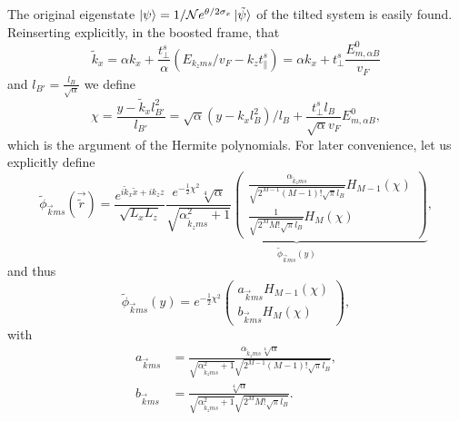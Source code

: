 The original eigenstate \(\ket{\psi } = 1 /\mathcal{N} e^{\theta /2 \sigma _{x}} \ket{\tilde{\psi} }\) of the tilted system is easily found.
Reinserting explicitly, in the boosted frame, that
\[
  \tilde{k}_{x} = \alpha k_{x} + \frac{t_{\perp}^s}{\alpha} (E_{k_z m s} /v_F- k_{z} t_{\parallel}^s)
  = \alpha k_x + t_{\perp}^s \frac{E^0_{m, \alpha B} }{v_{F}}
\]
and \(l_{B'}=\frac{l_{B}}{\sqrt{\alpha} }\)
we define
\begin{equation}
  \label{eq:49}
  \chi =
  \frac{y-\tilde{k}_{x} l_{B'}^2}{l_{B'}}
  =
  \sqrt{\alpha } (y-k_{x} l_{B}^2) /l_{B}
  + \frac{ t_{\perp}^s l_B }{ \sqrt{\alpha} v_F} E^{0}_{m, \alpha B},
\end{equation}
which is the argument of the Hermite polynomials.
For later convenience, let us explicitly define
\begin{equation}
  \label{eq:50}
  \tilde{\phi} _{\vec{k} m s} (\vec{\tilde{r}}) =
  \frac{e^{i \tilde{k}_{x} \tilde{x} + i k_{z} z}}{\sqrt{L_{x} L_{z}} }
  \underbrace{
  \frac{
    e^{-\frac{1}{2} \chi ^2}
    \sqrt[4]{\alpha }
  }
  {\sqrt{\alpha^2_{\tilde{k}_{z} m s} + 1} }
  \begin{pmatrix}
    \frac{\alpha_{\tilde{k}_z m s}}{\sqrt{2^{M-1} (M-1)! \sqrt{\pi } l_{B}}} H_{M-1}\left( \chi  \right)\\
    \frac{1}{\sqrt{2^M M! \sqrt{\pi } l_{B}}} H_M \left( \chi \right)
  \end{pmatrix}}_{\tilde{\phi}_{\vec{k} m s} (y)},
\end{equation}
and thus
\begin{equation}
  \label{eq:51}
  \tilde{\phi}_{\vec{k} m s} (y) =
  e^{-\frac{1}{2} \chi ^2}
  \begin{pmatrix}
    a_{\vec{k} m s} H_{M-1} (\chi)\\
    b_{\vec{k} m s} H_{M} (\chi)
  \end{pmatrix},
\end{equation}
with
\begin{align}
 \label{eq:52}
  a_{\vec{k} m s} &=
                    \frac{
                    \alpha_{\tilde{k}_z m s} \sqrt[4]{\alpha }
                    }{
                    \sqrt{\alpha^2 _{\tilde{k}_z m s} + 1}
                    \sqrt{2^{M-1} (M-1)! \sqrt{\pi} l_B}
                    },\\
  \label{eq:53}
  b_{\vec{k} m s} &=
                    \frac{
                     \sqrt[4]{\alpha }
                    }{
                    \sqrt{\alpha^2 _{\tilde{k}_z m s} + 1}
                    \sqrt{2^{M} M! \sqrt{\pi} l_B}
                    }.
\end{align}


